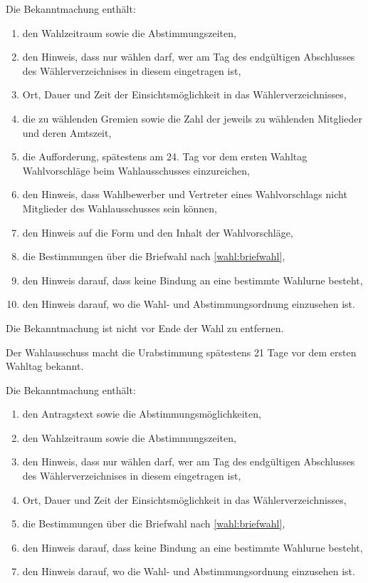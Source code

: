 \begin{jurdoc}
Die Bekanntmachung enthält:
\begin{enumerate}
     \item den Wahlzeitraum sowie die Abstimmungszeiten,
     \item den Hinweis, dass nur wählen darf, wer am Tag des endgültigen Abschlusses des Wählerverzeichnises in diesem eingetragen ist,
     \item Ort, Dauer und Zeit der Einsichtsmöglichkeit in das Wählerverzeichnisses,
     \item die zu wählenden Gremien sowie die Zahl der jeweils zu wählenden Mitglieder und deren Amtszeit,
     \item die Aufforderung, spätestens am 24. Tag vor dem ersten Wahltag Wahlvorschläge beim Wahlausschusses einzureichen, 
     \item den Hinweis, dass Wahlbewerber und Vertreter eines Wahlvorschlags nicht Mitglieder des Wahlausschusses sein können,
     \item den Hinweis auf die Form und den Inhalt der Wahlvorschläge,
     \item die Bestimmungen über die Briefwahl nach \ref{wahl:briefwahl},
     \item den Hinweis darauf, dass keine Bindung an eine bestimmte Wahlurne besteht,
     \item den Hinweis darauf, wo die Wahl- und Abstimmungsordnung einzusehen ist.
\end{enumerate}

Die Bekanntmachung ist nicht vor Ende der Wahl zu entfernen.

\label{wahl:bekanntmachung-ua}
Der Wahlausschuss macht die Urabstimmung spätestens 21 Tage vor dem ersten Wahltag bekannt.

Die Bekanntmachung enthält:
\begin{enumerate}
     \item den Antragstext sowie die Abstimmungsmöglichkeiten,
     \item den Wahlzeitraum sowie die Abstimmungszeiten,
     \item den Hinweis, dass nur wählen darf, wer am Tag des endgültigen Abschlusses des Wählerverzeichnises in diesem eingetragen ist,
     \item Ort, Dauer und Zeit der Einsichtsmöglichkeit in das Wählerverzeichnisses,
     \item die Bestimmungen über die Briefwahl nach \ref{wahl:briefwahl},
     \item den Hinweis darauf, dass keine Bindung an eine bestimmte Wahlurne besteht,
     \item den Hinweis darauf, wo die Wahl- und Abstimmungsordnung einzusehen ist.
\end{enumerate}


\end{jurdoc}
